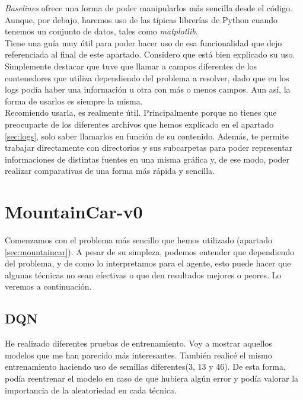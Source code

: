 \documentclass[11pt,fleqn]{book} %
\begin{document}
\textit{Baselines} ofrece una forma de poder manipularlos más sencilla desde el código. Aunque, por debajo, haremos uso de las típicas librerías de Python cuando tenemos un conjunto de datos, tales como \textit{matplotlib}. \\

Tiene una guía muy útil para poder hacer uso de esa funcionalidad que dejo referenciada al final de este apartado. Considero que está bien explicado su uso. Simplemente destacar que tuve que llamar a campos diferentes de los contenedores que utiliza dependiendo del problema a resolver, dado que en los logs podía haber una información u otra con más o menos campos. Aun así, la forma de usarlos es siempre la misma.\cite{article:plot} \\

Recomiendo usarla, es realmente útil. Principalmente porque no tienes que preocuparte de los diferentes archivos que hemos explicado en el apartado \ref{sec:logs}, solo saber llamarlos en función de su contenido. Además, te permite trabajar directamente con directorios y sus subcarpetas para poder representar informaciones de distintas fuentes en una misma gráfica y, de ese modo, poder realizar comparativas de una forma más rápida y sencilla.

\section{MountainCar-v0}\label{sec:exp:mountaincar}

Comenzamos con el problema más sencillo que hemos utilizado (apartado \ref{sec:mountaincar}). A pesar de su simpleza, podemos entender que dependiendo del problema, y de como lo interpretamos para el agente, esto puede hacer que algunas técnicas no sean efectivas o que den resultados mejores o peores. Lo veremos a continuación. \\

\subsection{DQN}\label{sec:mountain:DQN}

He realizado diferentes pruebas de entrenamiento. Voy a mostrar aquellos modelos que me han parecido más interesantes. También realicé el mismo entrenamiento haciendo uso de semillas diferentes(3, 13 y 46). De esta forma, podía reentrenar el modelo en caso de que hubiera algún error y podía valorar la importancia de la aleatoriedad en cada técnica. \\
\end{document}

